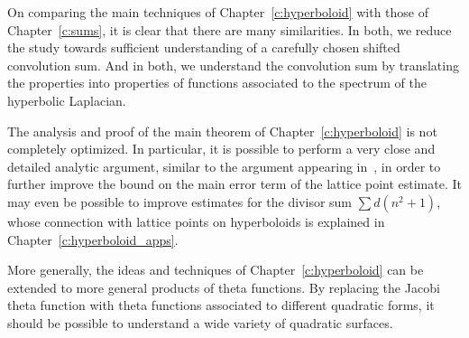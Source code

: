 On comparing the main techniques of Chapter~\ref{c:hyperboloid} with those of
Chapter~\ref{c:sums}, it is clear that there are many similarities.
In both, we reduce the study towards sufficient understanding of a carefully chosen
shifted convolution sum.
And in both, we understand the convolution sum by translating the properties into
properties of functions associated to the spectrum of the hyperbolic Laplacian.


The analysis and proof of the main theorem of Chapter~\ref{c:hyperboloid} is not
completely optimized.
In particular, it is possible to perform a very close and detailed analytic argument,
similar to the argument appearing in~\cite{hkldwShort}, in order to further improve the
bound on the main error term of the lattice point estimate.
It may even be possible to improve estimates for the divisor sum $\sum d(n^2 + 1)$, whose
connection with lattice points on hyperboloids is explained in
Chapter~\ref{c:hyperboloid_apps}.


More generally, the ideas and techniques of Chapter~\ref{c:hyperboloid} can be extended to
more general products of theta functions.
By replacing the Jacobi theta function with theta functions associated to different
quadratic forms, it should be possible to understand a wide variety of quadratic surfaces.

